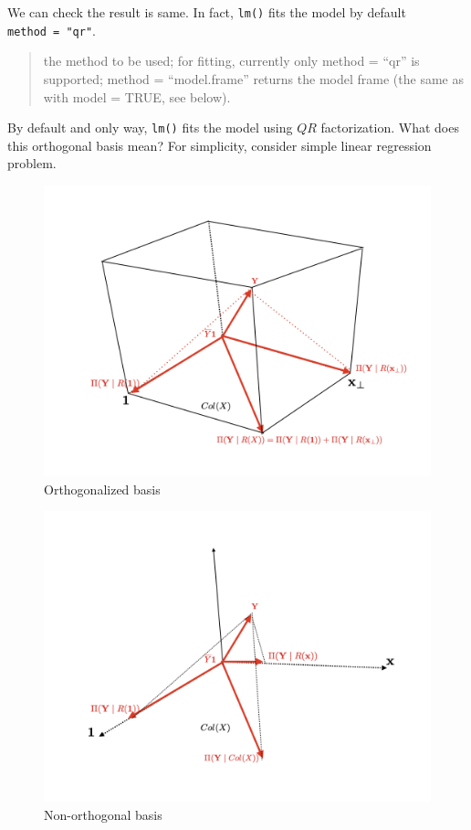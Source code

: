 \documentclass[]{book}
\theoremstyle{definition}
\theoremstyle{definition}
\theoremstyle{definition}
\theoremstyle{remark}
\begin{document}
We can check the result is same. In fact, \texttt{lm()} fits the model by default \texttt{method\ =\ "qr"}.

\begin{quote}
the method to be used; for fitting, currently only method = ``qr'' is supported; method = ``model.frame'' returns the model frame (the same as with model = TRUE, see below).
\end{quote}

By default and only way, \texttt{lm()} fits the model using \(QR\) factorization. What does this orthogonal basis mean? For simplicity, consider simple linear regression problem.

\begin{figure}[H]

{\centering \includegraphics[width=0.7\linewidth]{images/multiple-qr1} 

}

\caption{Orthogonalized basis}\label{fig:qrpng}
\end{figure}

\begin{figure}[H]

{\centering \includegraphics[width=0.7\linewidth]{images/multiple-qr2} 

}

\caption{Non-orthogonal basis}\label{fig:qrpng2}
\end{figure}
\end{document}
